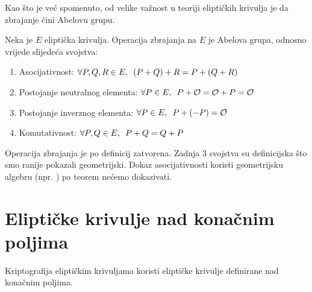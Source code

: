\documentclass{mathos}
\begin{document}
Kao što je već spomenuto, od velike važnost u teoriji eliptičkih krivulja je da zbrajanje čini Abelovu grupu.
\begin{theorem}
    Neka je $E$ eliptička krivulja. Operacija zbrajanja na $E$ je Abelova grupa, odnosno vrijede slijedeća svojstva:
    \begin{enumerate}
        \item Asocijativnost: $\\
            \forall P, Q, R \in E, \enspace (P + Q) + R = P + (Q + R)
            $
        \item Postojanje neutralnog elementa: $\\
            \forall P \in E, \enspace P + \mathcal{O} = \mathcal{O} + P = \mathcal{O}
            $
        \item Postojanje inverznog elementa: $\\
            \forall P \in E, \enspace P + (-P) = \mathcal{O}
            $
        \item Komutativnost: $\\
            \forall P, Q \in E, \enspace P + Q = Q + P
            $
    \end{enumerate}
\end{theorem}
\begin{nap}
    Operacija zbrajanja je po definicij zatvorena. Zadnja 3 svojstva su definicijska što smo ranije pokazali geometrijski. Dokaz asocijativnosti koristi geometrijsku algebru (npr. \cite{ASOCPROOF}) pa teorem nećemo dokazivati.
\end{nap}

\section{Eliptičke krivulje nad konačnim poljima}
Kriptografija eliptičkim krivuljama koristi eliptičke krivulje definirane nad konačnim poljima.
\end{document}
